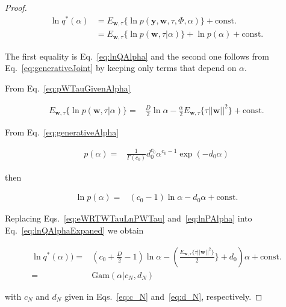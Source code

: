 \documentclass[12pt]{article}
\newlength\mystoreparindent
\newenvironment{myparindent}[1]{%
\setlength{\mystoreparindent}{\the\parindent}
\setlength{\parindent}{#1}
}{%
\setlength{\parindent}{\mystoreparindent}
}
\begin{document}
\begin{myparindent}{0pt}
\begin{proof}
\begin{align}
\ln q^*(\alpha)&=E_{\mathbf{w},\tau}\{\ln p(\mathbf{y},\mathbf{w},\tau,\Phi,\alpha)\}+\text{const.}\nonumber\\
&=E_{\mathbf{w},\tau}\{\ln p(\mathbf{w},\tau|\alpha)\}+\ln p(\alpha)+\text{const.}\label{eq:lnQAlphaExpaned}
\end{align}

The first equality is Eq.~\ref{eq:lnQAlpha} and the second one follows from
Eq.~\ref{eq:generativeJoint} by keeping only terms that depend on $\alpha$. 

From Eq.~\ref{eq:pWTauGivenAlpha}

\begin{align}
E_{\mathbf{w},\tau}\{\ln
p(\mathbf{w},\tau|\alpha)\}=&\frac{D}{2}\ln\alpha-\frac{\alpha}{2}E_{\mathbf{w},\tau}\{\tau||\mathbf{w}||^2\}+\text{const.}\label{eq:eWRTWTauLnPWTau}
\end{align}

From Eq.~\ref{eq:generativeAlpha}

\begin{align}
p(\alpha)=&\frac{1}{\Gamma(c_0)}d_0^{c_0}\alpha^{c_0-1}\exp(-d_0\alpha)\nonumber
\end{align}

then

\begin{align}
\ln p(\alpha)=&(c_0-1)\ln\alpha-d_0\alpha+\text{const.}\label{eq:lnPAlpha}
\end{align}

Replacing Eqs.~\ref{eq:eWRTWTauLnPWTau} and~\ref{eq:lnPAlpha} into
Eq.~\ref{eq:lnQAlphaExpaned} we obtain

\begin{align}
\ln
q^*(\alpha))={}&\left(c_0+\frac{D}{2}-1\right)\ln\alpha-\left(\frac{E_{\mathbf{w},\tau}\{\tau||\mathbf{w}||^2\}}{2}\}+d_0\right)\alpha+\text{const.}\nonumber\\
={}&\text{Gam}(\alpha|c_N,d_N)\nonumber
\end{align}

with $c_N$ and $d_N$ given in Eqs.~\ref{eq:c_N} and~\ref{eq:d_N},
respectively.
\end{proof}
\end{myparindent}
\end{document}
